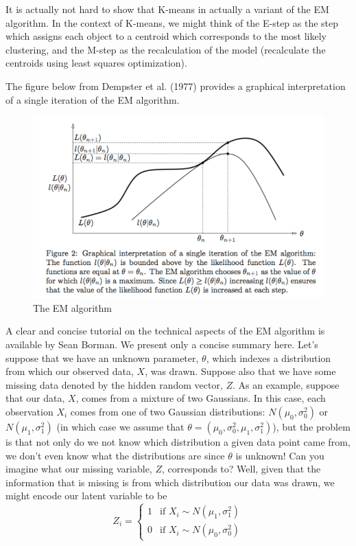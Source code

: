 It is actually not hard to show that K-means in actually a variant of the EM algorithm. In the context of K-means, we might think of the E-step as the step which assigns each object to a centroid which corresponds to the most likely clustering, and the M-step as the recalculation of the model (recalculate the centroids using least squares optimization). 

The figure below from Dempster et al. (1977) provides a graphical interpretation of a single iteration of the EM algorithm.


\begin{figure}[H]
\begin{center}
\includegraphics[scale=0.4]{EM.png}
\end{center}
\caption{The EM algorithm}
\label{fig:em}
\end{figure}

A clear and concise tutorial on the technical aspects of the EM algorithm is available by Sean Borman. We present only a concise summary here. Let's suppose that we have an unknown parameter, $\theta$, which indexes a distribution from which our observed data, $X$, was drawn. Suppose also that we have some missing data denoted by the hidden random vector, $Z$. As an example, suppose that our data, $X$, comes from a mixture of two Gaussians. In this case, each observation $X_i$ comes from one of two Gaussian distributions: $N(\mu_0, \sigma_0^2)$ or $N(\mu_1, \sigma_1^2)$ (in which case we assume that $\theta = (\mu_0, \sigma_0^2, \mu_1, \sigma_1^2)$), but the problem is that not only do we not know which distribution a given data point came from, we don't even know what the distributions are since $\theta$ is unknown! Can you imagine what our missing variable, $Z$, corresponds to? Well, given that the information that is missing is from which distribution our data was drawn, we might encode our latent variable to be
$$Z_i = \begin{cases} 1 &\text{if } X_i \sim N(\mu_1, \sigma_1^2)\\ 0 &\text{if } X_i \sim N(\mu_0, \sigma_0^2)\end{cases}$$

